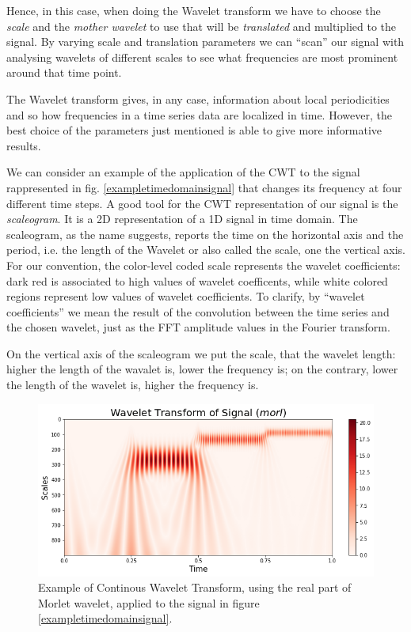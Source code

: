 \documentclass[12pt,a4paper]{report}
\begin{document}
Hence, in this case, when doing the Wavelet transform we have to choose the \emph{scale} and the \emph{mother wavelet} to use that will be \emph{translated} and multiplied to the signal. By varying scale and translation parameters we can ``scan'' our signal with analysing wavelets of different scales to see what frequencies are most prominent around that time point.

The Wavelet transform gives, in any case, information about local periodicities and so how frequencies in a time series data are localized in time. However, the best choice of the parameters just mentioned is able to give more informative results.

We can consider an example of the application of the CWT to the signal rappresented in fig. \ref{exampletimedomainsignal} that changes its frequency at four different time steps. A good tool for the CWT representation of our signal is the \emph{scaleogram}. It is a 2D representation of a 1D signal in time domain. The scaleogram, as the name suggests, reports the time on the horizontal axis and the period, i.e. the length of the Wavelet or also called the scale, one the vertical axis. For our convention, the color-level coded scale represents the wavelet coefficients: dark red is associated to high values of wavelet coefficents, while white colored regions represent low values of wavelet coefficients. To clarify, by ``wavelet coefficients'' we mean the result of the convolution between the time series and the chosen wavelet, just as the FFT amplitude values in the Fourier transform. 

On the vertical axis of the scaleogram we put the scale, that the wavelet length: higher the length of the wavalet is, lower the frequency is; on the contrary, lower the length of the wavelet is, higher the frequency is.

\begin{figure}[!ht]
\includegraphics[scale=0.59]{MorletTransformSignalExample.PNG}
\caption{Example of Continous Wavelet Transform, using the real part of Morlet wavelet, applied to the signal in figure \ref{exampletimedomainsignal}.}
\label{MorletTransfromSignalExample}
\end{figure}
\end{document}
